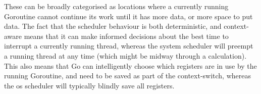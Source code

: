 These can be broadly categorised as locations where a currently running
Goroutine cannot continue its work until it has more data, or more space to put
data. The fact that the scheduler behaviour is both deterministic, and
context-aware means that it can make informed decisions about the best time to
interrupt a currently running thread, whereas the system scheduler will preempt
a running thread at any time (which might be midway through a calculation). This
also means that Go can intelligently choose which registers are in use by the
running Goroutine, and need to be saved as part of the context-switch, whereas
the \gls{os} scheduler will typically blindly save all registers.


